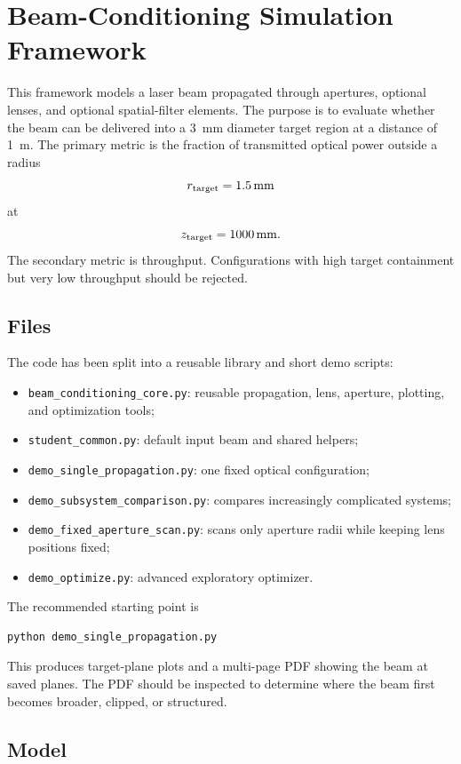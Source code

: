 \section{Beam-Conditioning Simulation Framework}

This framework models a laser beam propagated through apertures, optional lenses,
and optional spatial-filter elements. The purpose is to evaluate whether the beam
can be delivered into a \SI{3}{mm} diameter target region at a distance of
\SI{1}{m}. The primary metric is the fraction of transmitted optical power
outside a radius
\[
    r_{\rm target}=\SI{1.5}{mm}
\]
at
\[
    z_{\rm target}=\SI{1000}{mm}.
\]
The secondary metric is throughput. Configurations with high target containment
but very low throughput should be rejected.

\subsection{Files}

The code has been split into a reusable library and short demo scripts:
\begin{itemize}
    \item \texttt{beam\_conditioning\_core.py}: reusable propagation, lens,
    aperture, plotting, and optimization tools;
    \item \texttt{student\_common.py}: default input beam and shared helpers;
    \item \texttt{demo\_single\_propagation.py}: one fixed optical configuration;
    \item \texttt{demo\_subsystem\_comparison.py}: compares increasingly
    complicated systems;
    \item \texttt{demo\_fixed\_aperture\_scan.py}: scans only aperture radii
    while keeping lens positions fixed;
    \item \texttt{demo\_optimize.py}: advanced exploratory optimizer.
\end{itemize}

The recommended starting point is
\begin{verbatim}
python demo_single_propagation.py
\end{verbatim}
This produces target-plane plots and a multi-page PDF showing the beam at saved
planes. The PDF should be inspected to determine where the beam first becomes
broader, clipped, or structured.

\subsection{Model}

